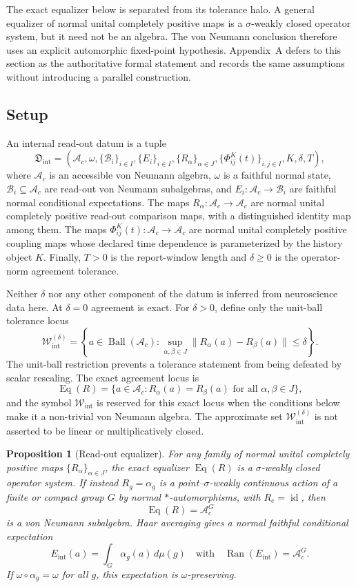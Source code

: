\documentclass[12pt]{article}
\newtheorem{proposition}{Proposition}[section]
\theoremstyle{definition}
\theoremstyle{remark}
\newcommand{\Ac}{\mathcal A_c}
\newcommand{\Wint}{\mathcal W_{\mathrm{int}}}
\begin{document}
The exact equalizer below is separated from its tolerance halo. A
general equalizer of normal unital completely positive maps is a
\(\sigma\)-weakly closed operator system, but it need not be an algebra.
The von Neumann conclusion therefore uses an explicit automorphic
fixed-point hypothesis. Appendix~A defers to this section as the
authoritative formal statement and records the same assumptions without
introducing a parallel construction.

\subsection{Setup}

An internal read-out datum is a tuple
\[
\mathfrak D_{\mathrm{int}}
=
(\Ac,\omega,\{\mathcal B_i\}_{i\in I},\{E_i\}_{i\in I},
\{R_\alpha\}_{\alpha\in J},
\{\Phi_{ij}^{K}(t)\}_{i,j\in I},K,\delta,T),
\]
where \(\Ac\) is an accessible von Neumann algebra, \(\omega\) is a
faithful normal state, \(\mathcal B_i\subseteq\Ac\) are read-out von
Neumann subalgebras, and \(E_i:\Ac\to\mathcal B_i\) are faithful normal
conditional expectations. The maps \(R_\alpha:\Ac\to\Ac\) are normal
unital completely positive read-out comparison maps, with a
distinguished identity map among them. The maps
\(\Phi_{ij}^{K}(t):\Ac\to\Ac\) are normal unital completely positive
coupling maps whose declared time dependence is parameterized by the
history object \(K\). Finally, \(T>0\) is the report-window length and
\(\delta\geq0\) is the operator-norm agreement tolerance.

Neither \(\delta\) nor any other component of the datum is inferred from
neuroscience data here. At \(\delta=0\) agreement is exact. For
\(\delta>0\), define only the unit-ball tolerance locus
\[
\Wint^{(\delta)}
=
\left\{a\in\operatorname{Ball}(\Ac):
\sup_{\alpha,\beta\in J}
\lVert R_\alpha(a)-R_\beta(a)\rVert\leq\delta
\right\}.
\]
The unit-ball restriction prevents a tolerance statement from being
defeated by scalar rescaling. The exact agreement locus is
\[
\operatorname{Eq}(R)
=
\bigl\{a\in\Ac:R_\alpha(a)=R_\beta(a)
\text{ for all }\alpha,\beta\in J
\bigr\},
\]
and the symbol \(\Wint\) is reserved for this exact locus when the
conditions below make it a non-trivial von Neumann algebra. The
approximate set \(\Wint^{(\delta)}\) is not asserted to be linear or
multiplicatively closed.

\begin{proposition}[Read-out equalizer]
\label{prop:readout-equalizer}
For any family of normal unital completely positive maps
\(\{R_\alpha\}_{\alpha\in J}\), the exact equalizer
\(\operatorname{Eq}(R)\) is a \(\sigma\)-weakly closed operator system.
If instead \(R_g=\alpha_g\) is a point--\(\sigma\)-weakly continuous
action of a finite or compact group \(G\) by normal
\(*\)-automorphisms, with \(R_e=\operatorname{id}\), then
\[
\operatorname{Eq}(R)=\Ac^G
\]
is a von Neumann subalgebra. Haar averaging gives a normal faithful
conditional expectation
\[
E_{\mathrm{int}}(a)=\int_G\alpha_g(a)\,d\mu(g)
\quad\text{with}\quad
\operatorname{Ran}(E_{\mathrm{int}})=\Ac^G.
\]
If \(\omega\circ\alpha_g=\omega\) for all \(g\), this expectation is
\(\omega\)-preserving.
\end{proposition}
\end{document}
